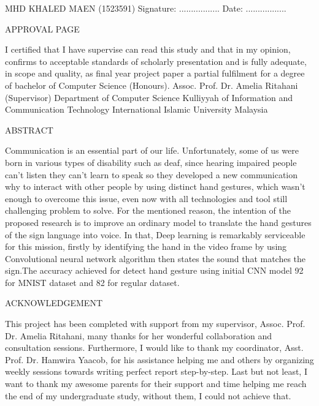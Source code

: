 \documentclass[12pt]{report}
\begin{document}
    \mbox{}
    \vfill
    MHD KHALED MAEN (1523591)
    \bigbreak
    Signature: .................\hspace{18em} Date: .................
    \bigbreak

    \newpage
    \begin{center}
        \LARGE APPROVAL PAGE
    \end{center} 

        I certified that I have supervise can read this study and that in my opinion,
        confirms to acceptable standards of scholarly presentation and is fully adequate,
        in scope and quality, as final year project paper a partial fulfilment for a 
        degree of bachelor of Computer Science (Honours).
    \mbox{}
    \vfill
        Assoc. Prof. Dr. Amelia Ritahani (Supervisor)
    \bigbreak
        Department of Computer Science
    \bigbreak
        Kulliyyah of Information and Communication Technology
    \bigbreak
        International Islamic University Malaysia
    \bigbreak

    \newpage

     \begin{center}
        \LARGE ABSTRACT
    \end{center}

        Communication is an essential part of our life.
        Unfortunately, some of us were born in various types of disability such as deaf,
        since hearing impaired people can't listen they can't learn to speak so they developed 
        a new communication why to interact with other people by using distinct hand gestures, 
        which wasn't enough to overcome this issue, even now with all technologies and tool still challenging problem to solve.
        For the mentioned reason, 
        the intention of the proposed research is to improve an ordinary model to translate the hand gestures of the sign language into voice.
        In that, Deep learning is remarkably serviceable for this mission, 
        firstly by identifying the hand in the video frame by using Convolutional
        neural network algorithm then states the sound that matches the sign.The accuracy achieved for detect hand gesture using initial CNN model 92 \text{\%} for MNIST
        dataset and 82\text{\%} for regular dataset.
    

    \newpage
    \begin{center}
        \LARGE ACKNOWLEDGEMENT
    \end{center} 

        This project has been completed with support from my supervisor, Assoc. Prof. Dr. Amelia Ritahani, many thanks for her wonderful 
        collaboration and consultation sessions. Furthermore, 
        I would like to thank my coordinator, Asst. Prof. Dr. Hamwira Yaacob, for his 
        assistance helping me and others by organizing weekly sessions towards writing perfect report step-by-step. 
        Last but not least,
        I want to thank my awesome parents for their support and time helping me reach the end of my undergraduate study, without them, I could not achieve that.
                   
\end{document}
